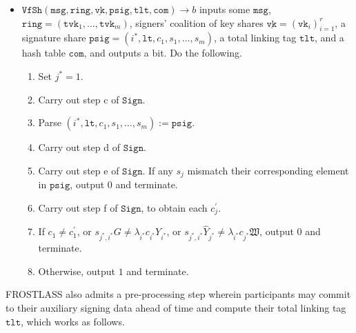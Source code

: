 \documentclass[11pt]{article}
\theoremstyle{definition}
\newcommand{\vk}{\texttt{vk}}
\newcommand{\lt}{\texttt{lt}}
\newcommand{\tlt}{\texttt{tlt}}
\newcommand{\tvk}{\texttt{tvk}}
\newcommand{\ring}{\texttt{ring}}
\newcommand{\VK}{\underline{\texttt{vk}}}
\newcommand{\psig}{\texttt{psig}}
\newcommand{\msg}{\texttt{msg}}
\newcommand{\sign}{\texttt{Sign}}
\newcommand{\verifyshare}{\texttt{VfSh}}
\begin{document}
\begin{itemize}
\item $\verifyshare(\msg, \ring, \VK, \psig, \tlt, \texttt{com}) \to b$ inputs some $\msg$,  $\ring = (\tvk_1, \ldots, \tvk_m)$,
signers' coalition of key shares $\VK = (\vk_i)_{i=1}^{r}$, a signature share $\psig=(i^*, \lt, c_1, s_1, \ldots, s_m)$, a total linking tag $\tlt$, and a hash table $\texttt{com}$, and outputs a bit. Do the following.
\begin{enumerate}
\item Set $j^* = 1$.
\item Carry out step c of $\sign$.
\item Parse $(i^*, \lt, c_1, s_1, \ldots, s_m) := \psig$.
\item Carry out step d of $\sign$.
\item Carry out step e of $\sign$. If any $s_j$ mismatch their corresponding element in $\psig$, output $0$ and terminate.
\item Carry out step f of $\sign$, to obtain each $c_j^\prime$.
\item If $c_1 \neq c_1^\prime$, or $s_{j^*, i^*}G \neq \lambda_{i^*} c_{i^*} Y_{i^*}$, or $s_{j^*, i^*}\widehat{Y}_{j^*} \neq \lambda_{i^*}c_{j^*} \mathfrak{W}$, output $0$ and terminate.
\item Otherwise, output $1$ and terminate.
\end{enumerate}
\end{itemize}


FROSTLASS also admits a pre-processing step wherein participants may commit to their auxiliary signing data ahead of time and compute their total linking tag $\tlt$, which works as follows.
\end{document}
